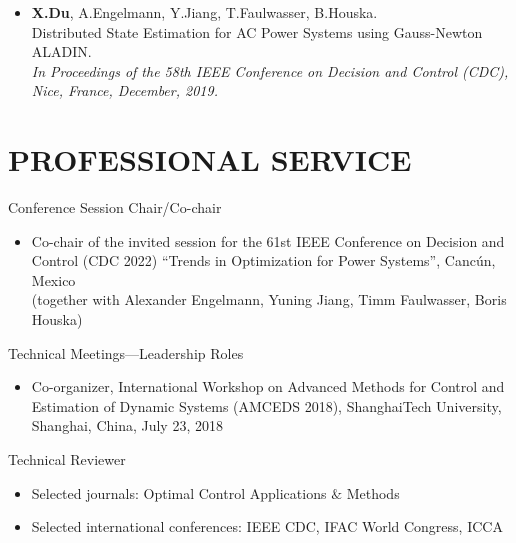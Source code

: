 \documentclass[paper=a4,fontsize=11pt]{scrartcl} %
\newcommand{\NewPart}[1]{\section*{\uppercase{#1}}}
\newcommand{\EducationEntry}[4]{
		\noindent \textbf{#1} \hfill      %
		\colorbox{White}{%
			\parbox{5cm}{%
			\hfill\color{Black}#2}} \par  %
		\noindent \textit{#3} \par        %
		\noindent\hangindent=2em\hangafter=0 \small #4 %
		\normalsize \par}
\begin{document}
\begin{itemize}
	\item  {\textbf{X.Du}, A.Engelmann, Y.Jiang, T.Faulwasser, B.Houska. \\
		Distributed State Estimation for AC Power Systems using Gauss-Newton ALADIN. \\
		 \emph{In Proceedings of the 58th IEEE Conference on Decision and Control (CDC),
		Nice, France, December, 2019.} }
\end{itemize}

\NewPart{Professional Service}{Conference Session Chair/Co-chair}
%
\begin{itemize}
	\item{Co-chair of the invited session for the 61st
		IEEE Conference on Decision and Control (CDC 2022)
		“Trends in Optimization for Power Systems”, Canc\'un, Mexico}\\
	(together with Alexander Engelmann, Yuning Jiang, Timm Faulwasser, Boris Houska)
	\end{itemize}
{Technical Meetings—Leadership Roles}
\begin{itemize}
\item{Co-organizer, International Workshop on Advanced Methods for Control and Estimation of Dynamic
	Systems (AMCEDS 2018), ShanghaiTech University, Shanghai, China, July 23, 2018}
\end{itemize}
{Technical Reviewer}
\begin{itemize}
	\item Selected journals: Optimal Control Applications $\&$ Methods
	\item Selected international conferences: IEEE CDC, IFAC World Congress, ICCA
\end{itemize}
\end{document}
